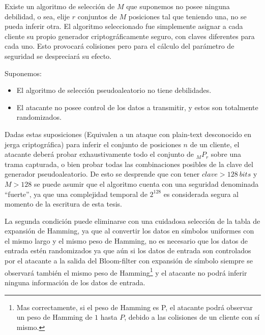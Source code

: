 Existe un algoritmo de selección de $M$ que suponemos no posee ninguna debilidad, o sea, elije $r$ conjuntos de $M$ posiciones tal que teniendo una, no se pueda inferir otra.
El algoritmo seleccionado fue simplemente asignar a cada cliente su propio generador criptográficamente seguro, con claves diferentes para cada uno. Esto provocará colisiones pero para el cálculo del parámetro de seguridad se despreciará su efecto.

Suponemos:
\begin{itemize}
 \item El algoritmo de selección pseudoaleatorio no tiene debilidades.
 \item El atacante no posee control de los datos a transmitir, y estos son totalmente randomizados.
\end{itemize}

Dadas estas suposiciones (Equivalen a un ataque con plain-text desconocido en jerga criptográfica) para inferir el conjunto de posiciones $n$ de un cliente, el atacante deberá probar exhaustivamente todo el conjunto de $ _{M}P_{r}$ sobre una trama capturada, o bien probar todas las combinaciones posibles de la clave del generador pseudoaleatorio. De esto se desprende que con tener $clave>128\ bits$ y $M>128$ se puede asumir que el algoritmo cuenta con una seguridad denominada ``fuerte'', ya que una complejidad temporal de $2 ^{128}$ es considerada segura al momento de la escritura de esta tesis.

La segunda condición puede eliminarse con una cuidadosa selección de la tabla de expansión de Hamming, ya que al convertir los datos en símbolos uniformes con el mismo largo y el mismo peso de Hamming, no es necesario que los datos de entrada estén randomizados ya que aún si los datos de entrada son controlados por el atacante a la salida del Bloom-filter con expansión de símbolo siempre se observará también el mismo peso de Hamming\footnote{Mas correctamente, si el peso de Hamming es P, el atacante podrá observar un peso de Hamming de $1$ hasta $P$, debido a las colisiones de un cliente con sí mismo.} y el atacante no podrá inferir ninguna información de los datos de entrada.

